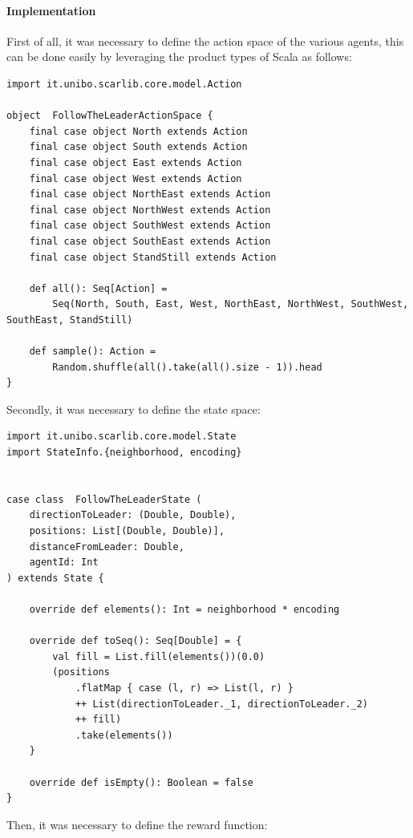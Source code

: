 \documentclass[12pt,a4paper,openright,twoside]{book}
\begin{document}
\paragraph{Implementation}
First of all, it was necessary to define the action space of the various agents, this can be done easily by leveraging the product types of Scala as follows:
\begin{lstlisting}
import it.unibo.scarlib.core.model.Action

object  FollowTheLeaderActionSpace {
    final case object North extends Action
    final case object South extends Action
    final case object East extends Action
    final case object West extends Action
    final case object NorthEast extends Action
    final case object NorthWest extends Action
    final case object SouthWest extends Action
    final case object SouthEast extends Action
    final case object StandStill extends Action

    def all(): Seq[Action] =
        Seq(North, South, East, West, NorthEast, NorthWest, SouthWest, SouthEast, StandStill)
    
    def sample(): Action = 
        Random.shuffle(all().take(all().size - 1)).head
}
\end{lstlisting}
Secondly, it was necessary to define the state space:
\begin{lstlisting}
import it.unibo.scarlib.core.model.State
import StateInfo.{neighborhood, encoding}


case class  FollowTheLeaderState (
    directionToLeader: (Double, Double),
    positions: List[(Double, Double)], 
    distanceFromLeader: Double,
    agentId: Int
) extends State {
    
    override def elements(): Int = neighborhood * encoding

    override def toSeq(): Seq[Double] = {
        val fill = List.fill(elements())(0.0)
        (positions
            .flatMap { case (l, r) => List(l, r) } 
            ++ List(directionToLeader._1, directionToLeader._2) 
            ++ fill)
            .take(elements()) 
    }

    override def isEmpty(): Boolean = false
}
\end{lstlisting}
Then, it was necessary to define the reward function:
\end{document}

